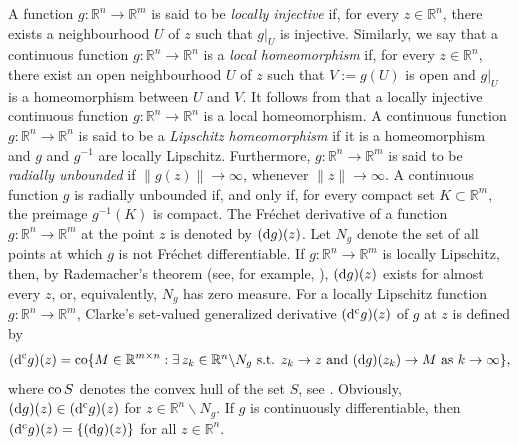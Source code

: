 \documentclass[a4paper,11pt]{article}
\newcommand{\R}{\mathbb R}
\numberwithin{equation}{section}
\numberwithin{figure}{section}
\numberwithin{table}{section}
\begin{document}
A function $g:\R^n\to\R^m$ is said to be {\it locally injective} if, for every $z\in\R^n$, there
exists a neighbourhood $U$ of $z$ such that $g|_U$ is injective. Similarly, we say that a continuous function $g:\R^n\to\R^n$ is a {\it local homeomorphism} if, for every $z\in\R^n$, there exist an open neighbourhood $U$ of $z$ such that $V:=g(U)$ is open and $g|_U$ is a homeomorphism between $U$ and $V$. It follows from  that a locally injective continuous function
$g:\R^n\to\R^n$ is a local homeomorphism. A continuous function $g:\R^n\to\R^n$ is said to be a {\it Lipschitz homeomorphism} if it is a homeomorphism and $g$ and $g^{-1}$ are locally Lipschitz.
Furthermore, $g:\R^n\to\R^m$ is said to be {\it radially
unbounded} if $\|g(z)\|\to\infty$, whenever $\|z\|\to\infty$. A continuous function $g$ is radially
unbounded if, and only if, for every compact set $K\subset\R^m$, the preimage $g^{-1}(K)$ is compact.
The  Fr{\'e}chet derivative of a function $g:\R^n\to\R^m$ at the point $z$ is denoted by $({\rm d}g)(z)$. Let $N_g$ denote the set of all points at which $g$ is not Fr{\'e}chet differentiable. If $g:\R^n\to\R^m$ is locally Lipschitz, then, by Rademacher's theorem (see, for example, \cite[Corollary 4.19, Chapter 3]{clsw98}), $({\rm d}g)(z)$ exists for almost every $z$, or, equivalently, $N_g$ has zero measure. For a locally Lipschitz function $g:\R^n\to\R^m$, Clarke's set-valued generalized derivative $({\rm d}^{\rm c}g)(z)$ of $g$ at $z$ is defined by
\begin{equation}\label{eq:clarke_derivative}
({\rm d}^{\rm c}g)(z)={\rm co}\{M\in\R^{m\times n}:\mbox{$\exists\,z_k\in\R^n\backslash N_g$ s.t.
$z_k\to z$ and $({\rm d}g)(z_k)\to M$ as $k\to\infty$}\},
\end{equation}
where ${\rm co}\,S$ denotes the convex hull of the set $S$, see \cite{c76,c90,clsw98}.
Obviously, $({\rm d}g)(z)\in ({\rm d}^{\rm c}g)(z)$ for $z\in\R^n\backslash N_g$.
If $g$ is continuously differentiable, then $({\rm d}^{\rm c}g)(z)=\{({\rm d}g)(z)\}$ for all $z\in\R^n$.
\end{document}
